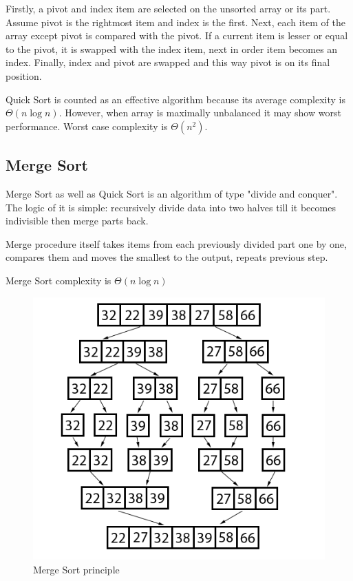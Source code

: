 \documentclass[
  field=inf,
  biblatex,
  language=english,
  glossaries,
  theorems=false,
  sourcecodes=false,
  index
]{kidiplom}
\begin{document}
Firstly, a pivot and index item are selected on the unsorted array or its part. Assume pivot is the rightmost item and index is the first. Next, each item of the array except pivot is compared with the pivot. If a current item is lesser or equal to the pivot, it is swapped with the index item, next in order item becomes an index. Finally, index and pivot are swapped and this way pivot is on its final position.

Quick Sort is counted as an effective algorithm because its average complexity is $\Theta(n \log n)$. However, when array is maximally unbalanced it may show worst performance. Worst case complexity is $\Theta(n^2)$.

\subsection{Merge Sort}

Merge Sort as well as Quick Sort is an algorithm of type "divide and conquer". The logic of it is simple: recursively divide data into two halves till it becomes indivisible then merge parts back.

Merge procedure itself takes items from each previously divided part one by one, compares them and moves the smallest to the output, repeats previous step.

Merge Sort complexity is $\Theta(n \log n)$

\begin{figure}[H]
\begin{center}
	
	\includegraphics[scale=2.5]{img/Mergesort.png}
	\caption{Merge Sort principle}\label{fig:insert}
\end{center}
\end{figure}
\end{document}
